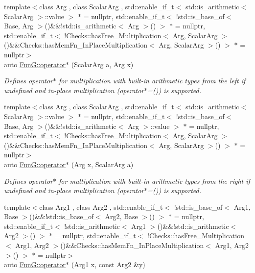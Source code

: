 \begin{DoxyCompactItemize}
{\footnotesize template$<$class Arg , class Scalar\+Arg , std\+::enable\+\_\+if\+\_\+t$<$ std\+::is\+\_\+arithmetic$<$ Scalar\+Arg $>$\+::value $>$ $\ast$  = nullptr, std\+::enable\+\_\+if\+\_\+t$<$ !std\+::is\+\_\+base\+\_\+of$<$ Base, Arg $>$()\&\&!std\+::is\+\_\+arithmetic$<$ Arg $>$() $>$ $\ast$  = nullptr, std\+::enable\+\_\+if\+\_\+t$<$ !\+Checks\+::has\+Free\+\_\+\+Multiplication$<$ Arg, Scalar\+Arg $>$()\&\&\+Checks\+::has\+Mem\+Fn\+\_\+\+In\+Place\+Multiplication$<$ Arg, Scalar\+Arg $>$() $>$ $\ast$  = nullptr$>$ }\\auto \hyperlink{namespaceFunG_a9b303ce8718a6f64b035e7e782370734}{Fun\+G\+::operator$\ast$} (Scalar\+Arg a, Arg x)
\begin{DoxyCompactList}\small\item\em Defines operator$\ast$ for multiplication with built-\/in arithmetic types from the left if undefined and in-\/place multiplication (operator$\ast$=()) is supported. \end{DoxyCompactList}\item 
{\footnotesize template$<$class Arg , class Scalar\+Arg , std\+::enable\+\_\+if\+\_\+t$<$ std\+::is\+\_\+arithmetic$<$ Scalar\+Arg $>$\+::value $>$ $\ast$  = nullptr, std\+::enable\+\_\+if\+\_\+t$<$ !std\+::is\+\_\+base\+\_\+of$<$ Base, Arg $>$()\&\&!std\+::is\+\_\+arithmetic$<$ Arg $>$\+::value $>$ $\ast$  = nullptr, std\+::enable\+\_\+if\+\_\+t$<$ !\+Checks\+::has\+Free\+\_\+\+Multiplication$<$ Arg, Scalar\+Arg $>$()\&\&\+Checks\+::has\+Mem\+Fn\+\_\+\+In\+Place\+Multiplication$<$ Arg, Scalar\+Arg $>$() $>$ $\ast$  = nullptr$>$ }\\auto \hyperlink{namespaceFunG_a3cd5a2cb1abba842154691bb84aab896}{Fun\+G\+::operator$\ast$} (Arg x, Scalar\+Arg a)
\begin{DoxyCompactList}\small\item\em Defines operator$\ast$ for multiplication with built-\/in arithmetic types from the right if undefined and in-\/place multiplication (operator$\ast$=()) is supported. \end{DoxyCompactList}\item 
{\footnotesize template$<$class Arg1 , class Arg2 , std\+::enable\+\_\+if\+\_\+t$<$ !std\+::is\+\_\+base\+\_\+of$<$ Arg1, Base $>$()\&\&!std\+::is\+\_\+base\+\_\+of$<$ Arg2, Base $>$() $>$ $\ast$  = nullptr, std\+::enable\+\_\+if\+\_\+t$<$ !std\+::is\+\_\+arithmetic$<$ Arg1 $>$()\&\&!std\+::is\+\_\+arithmetic$<$ Arg2 $>$() $>$ $\ast$  = nullptr, std\+::enable\+\_\+if\+\_\+t$<$ !\+Checks\+::has\+Free\+\_\+\+Multiplication$<$ Arg1, Arg2 $>$()\&\&\+Checks\+::has\+Mem\+Fn\+\_\+\+In\+Place\+Multiplication$<$ Arg1, Arg2 $>$() $>$ $\ast$  = nullptr$>$ }\\auto \hyperlink{namespaceFunG_ad023f2d2273af693f2b4ebceeb296dc8}{Fun\+G\+::operator$\ast$} (Arg1 x, const Arg2 \&y)

\end{DoxyCompactItemize}

